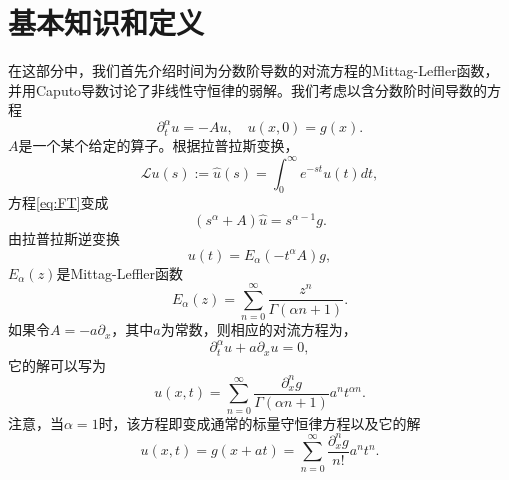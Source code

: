 \section{基本知识和定义}
在这部分中，我们首先介绍时间为分数阶导数的对流方程的Mittag-Leffler函数，并用Caputo导数讨论了非线性守恒律的弱解。我们考虑以含分数阶时间导数的方程
\begin{equation}\label{eq:FT}
\partial_t^\alpha u = -A u,\quad u(x,0)=g(x).
\end{equation}
$A$是一个某个给定的算子。根据拉普拉斯变换，
\[
\mathcal L u(s):=\hat u(s)= \int_0^\infty e^{-st} u(t)dt,
\]
方程\eqref{eq:FT}变成
\[
(s^\alpha + A)\hat u = s^{\alpha-1} g. 
\]
由拉普拉斯逆变换
\begin{equation}
u(t)=E_\alpha (-t^\alpha A) g,
\end{equation}
$E_\alpha(z)$是Mittag-Leffler函数
\begin{equation}
E_\alpha(z)=\sum_{n=0}^\infty \frac{z^n}{\Gamma (\alpha n+1)}.
\end{equation}
如果令$A = -a\partial_x$，其中$a$为常数，则相应的对流方程为，
\begin{equation}
\partial_t^\alpha u + a\partial_x u = 0,
\end{equation}
它的解可以写为
\begin{equation}
u(x,t) = \sum_{n=0}^\infty \frac{\partial_x^{n} g}{\Gamma(\alpha n + 1)}a^n t^{\alpha n}.
\end{equation}
注意，当$\alpha =1$时，该方程即变成通常的标量守恒律方程以及它的解
\begin{equation}
u(x,t) = g(x+at) = \sum_{n=0}^\infty \frac{\partial^n_x g}{n!} a^n t^n.
\end{equation}

